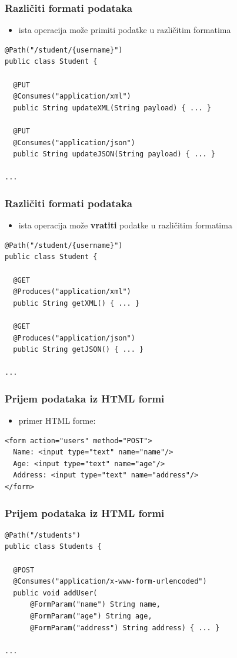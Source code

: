 \documentclass[compress]{beamer}
\begin{document}
\begin{frame}[fragile]
  \frametitle{Različiti formati podataka}
\begin{itemize}
\item ista operacija može primiti podatke u različitim formatima
\end{itemize}
\begin{verbatim}
@Path("/student/{username}")
public class Student {

  @PUT
  @Consumes("application/xml")
  public String updateXML(String payload) { ... }
  
  @PUT
  @Consumes("application/json")
  public String updateJSON(String payload) { ... }
  
...

\end{verbatim}
\end{frame}

\begin{frame}[fragile]
  \frametitle{Različiti formati podataka}
\begin{itemize}
\item ista operacija može \textbf{vratiti} podatke u različitim formatima
\end{itemize}
\begin{verbatim}
@Path("/student/{username}")
public class Student {

  @GET
  @Produces("application/xml")
  public String getXML() { ... }
  
  @GET
  @Produces("application/json")
  public String getJSON() { ... }
  
...

\end{verbatim}
\end{frame}

\begin{frame}[fragile]
  \frametitle{Prijem podataka iz HTML formi}
\begin{itemize}
\item primer HTML forme:
\end{itemize}
\begin{verbatim}
<form action="users" method="POST">
  Name: <input type="text" name="name"/>
  Age: <input type="text" name="age"/>
  Address: <input type="text" name="address"/>
</form>
\end{verbatim}
\end{frame}

\begin{frame}[fragile]
  \frametitle{Prijem podataka iz HTML formi}
\begin{verbatim}
@Path("/students")
public class Students {

  @POST
  @Consumes("application/x-www-form-urlencoded")
  public void addUser(
      @FormParam("name") String name,
      @FormParam("age") String age,
      @FormParam("address") String address) { ... }
  
...
\end{verbatim}
\end{frame}
\end{document}
